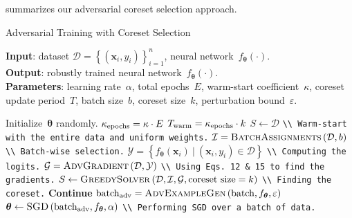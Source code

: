 \documentclass[runningheads]{llncs}
\begin{document}
 summarizes our adversarial coreset selection approach.
\begin{algorithm}[t!]
\vspace*{0.25em}
\caption{Adversarial Training with Coreset Selection~\label{alg:adv_core}} 
\begin{small}
\textbf{Input}: dataset $\mathcal{D}=\left\{\left(\boldsymbol{x}_{i}, y_{i}\right)\right\}_{i=1}^{n}$, neural network~${f_{\boldsymbol{\theta}}(\cdot)}$.\vspace*{0.25em}
\\
\textbf{Output}: robustly trained neural network~${f_{\boldsymbol{\theta}}(\cdot)}$.\vspace*{0.25em}
\\
\textbf{Parameters}: learning rate~$\alpha$, total epochs~$E$, warm-start coefficient~$\kappa$, coreset update period~$T$, batch size~$b$, coreset size~$k$, perturbation bound~$\varepsilon$.\vspace*{0.25em}
\begin{algorithmic}[1]
	\State Initialize~${\boldsymbol{\theta}}$ randomly.
	\State $\kappa_{\rm epochs} = \kappa \cdot E$
	\State $T_{\mathrm{warm}} = \kappa_{\rm epochs} \cdot k$
	\vspace*{0.15em}
	\State $S \leftarrow \mathcal{D}$ \verb+\\ Warm-start with the entire data and uniform weights.+
	 \vspace*{0.15em}
	\State $\mathcal{I} = \text{\textsc{BatchAssignments}}\left(\mathcal{D}, b\right)$ \verb+\\ Batch-wise selection.+\vspace*{0.15em}
	\State $\mathcal{Y} = \left\{{f_{\boldsymbol{\theta}}(\boldsymbol{x}_{i})}~|~\left(\boldsymbol{x}_{i}, y_{i}\right) \in \mathcal{D}\right\}$ \verb+\\ Computing the logits.+\vspace*{0.15em}
	\State $\mathcal{G} = \text{\textsc{AdvGradient}}\left(\mathcal{D}, \mathcal{Y}\right)$ \verb+\\ Using Eqs. 12 & 15 to find the gradients.+\vspace*{0.15em}
	\State $S\leftarrow\text{\textsc{GreedySolver}}\left(\mathcal{D}, \mathcal{I}, \mathcal{G}, \mathrm{coreset~size}=k\right)$ \verb+\\ Finding the coreset.+\vspace*{0.15em}
	\Else
	\State \textbf{Continue}
	\EndIf
	\State $\mathrm{batch_{adv}}=\text{\textsc{AdvExampleGen}}\left(\mathrm{batch}, f_{\boldsymbol{\theta}}, \varepsilon\right)$ \vspace*{0.15em}
	\State $\boldsymbol{\theta}\leftarrow\text{\textsc{SGD}}\left(\mathrm{batch_{adv}}, f_{\boldsymbol{\theta}}, \alpha\right)$ \verb+\\ Performing SGD over a batch of data.+ \vspace*{0.15em}
	\EndFor
	\EndFor
\end{algorithmic}
\end{small}
\end{algorithm}
\end{document}
